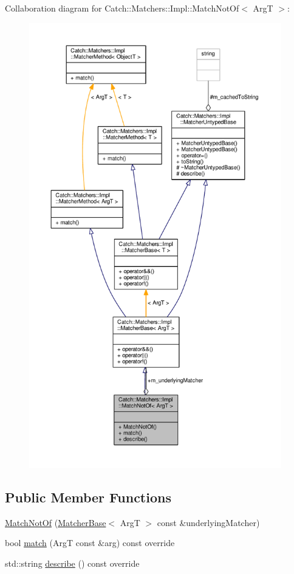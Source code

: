 Collaboration diagram for Catch\-:\-:Matchers\-:\-:Impl\-:\-:Match\-Not\-Of$<$ Arg\-T $>$\-:
\nopagebreak
\begin{figure}[H]
\begin{center}
\leavevmode
\includegraphics[height=550pt]{struct_catch_1_1_matchers_1_1_impl_1_1_match_not_of__coll__graph}
\end{center}
\end{figure}
\subsection*{Public Member Functions}
\begin{DoxyCompactItemize}
\item 
\hyperlink{struct_catch_1_1_matchers_1_1_impl_1_1_match_not_of_a47afdd9e4c3354cef85adc3186097ae4}{Match\-Not\-Of} (\hyperlink{struct_catch_1_1_matchers_1_1_impl_1_1_matcher_base}{Matcher\-Base}$<$ Arg\-T $>$ const \&underlying\-Matcher)
\item 
bool \hyperlink{struct_catch_1_1_matchers_1_1_impl_1_1_match_not_of_a181d693c0258e582d80dc6117a1f2b66}{match} (Arg\-T const \&arg) const override
\item 
std\-::string \hyperlink{struct_catch_1_1_matchers_1_1_impl_1_1_match_not_of_ac5fb4ef6a9069d23a4098c3c818f06b0}{describe} () const override
\end{DoxyCompactItemize}
